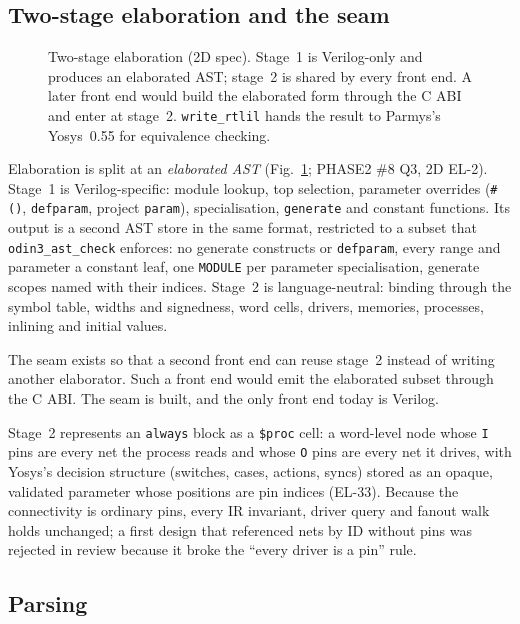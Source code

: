 \documentclass[conference]{IEEEtran}
\newcommand{\code}[1]{\texttt{#1}}
\begin{document}
\subsection{Two-stage elaboration and the seam}
\label{sec:seam}

\begin{figure}[t]
\centering
\odinfit{\textwidth}{}
\caption{Two-stage elaboration (2D spec). Stage~1 is Verilog-only and produces an elaborated
AST; stage~2 is shared by every front end. A later front end would build the elaborated form
through the C ABI and enter at stage~2. \code{write\_rtlil} hands the result to Parmys's Yosys~0.55 for
equivalence checking.}
\label{fig:seam}
\end{figure}

Elaboration is split at an \emph{elaborated AST} (Fig.~\ref{fig:seam}; PHASE2 \#8 Q3, 2D
EL-2). Stage~1 is Verilog-specific: module lookup, top selection, parameter overrides
(\code{\#()}, \code{defparam}, project \code{param}), specialisation, \code{generate} and
constant functions. Its output is a second AST store in the same format, restricted to a
subset that \code{odin3\_ast\_check} enforces: no generate constructs or \code{defparam}, every
range and parameter a constant leaf, one \code{MODULE} per parameter specialisation, generate
scopes named with their indices. Stage~2 is language-neutral: binding through the symbol table,
widths and signedness, word cells, drivers, memories, processes, inlining and initial values.

The seam exists so that a second front end can reuse stage~2 instead of writing another
elaborator. Such a front end would emit the elaborated subset through the C ABI. The seam is
built, and the only front end today is Verilog.

Stage~2 represents an \code{always} block as a \code{\$proc} cell: a word-level node whose
\code{I} pins are every net the process reads and whose \code{O} pins are every net it drives,
with Yosys's decision structure (switches, cases, actions, syncs) stored as an opaque, validated
parameter whose positions are pin indices (EL-33). Because the connectivity is ordinary pins,
every IR invariant, driver query and fanout walk holds unchanged; a first design that referenced
nets by ID without pins was rejected in review because it broke the ``every driver is a pin''
rule.

\subsection{Parsing}
\label{sec:parser}
\end{document}
